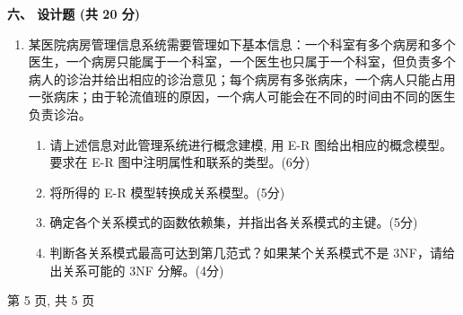 \documentclass{ctexart} %
\begin{document}
\raggedright
\textbf{\large 六、 设计题 (共 20 分)}
\vspace{1em}

\begin{enumerate}[label=\arabic*.]
    

    \item 某医院病房管理信息系统需要管理如下基本信息：一个科室有多个病房和多个医生，一个病房只能属于一个科室，一个医生也只属于一个科室，但负责多个病人的诊治并给出相应的诊治意见；每个病房有多张病床，一个病人只能占用一张病床；由于轮流值班的原因，一个病人可能会在不同的时间由不同的医生负责诊治。 %
    \begin{enumerate}[label=(\arabic*)] %
        \item 请上述信息对此管理系统进行概念建模, 用 E-R 图给出相应的概念模型。要求在 E-R 图中注明属性和联系的类型。(6分)
        \item 将所得的 E-R 模型转换成关系模型。(5分)
        \item 确定各个关系模式的函数依赖集，并指出各关系模式的主键。(5分)
        \item 判断各关系模式最高可达到第几范式？如果某个关系模式不是 3NF，请给出关系可能的 3NF 分解。(4分)
    \end{enumerate}
\end{enumerate}

\vfill
\centering
第 5 页, 共 5 页 %
\end{document}
